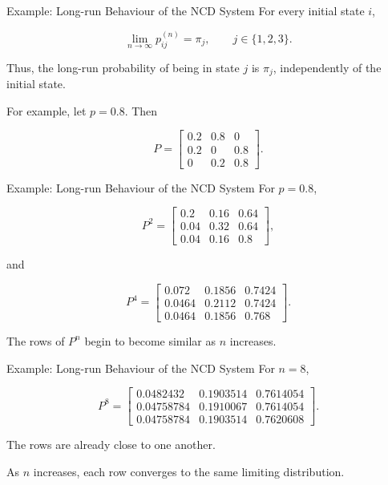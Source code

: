 \documentclass[
  ignorenonframetext,
  aspectratio=169,
]{beamer}
\begin{document}
\begin{frame}{Example: Long-run Behaviour of the NCD System}
\protect{}\label{example-long-run-behaviour-of-the-ncd-system-1}
For every initial state \(i\),

\[
\lim_{n\to\infty}p_{ij}^{(n)}
=
\pi_j,
\qquad j\in\{1,2,3\}.
\]

Thus, the long-run probability of being in state \(j\) is \(\pi_j\),
independently of the initial state.

For example, let \(p=0.8\). Then

\[
P=
\begin{bmatrix}
0.2&0.8&0\\
0.2&0&0.8\\
0&0.2&0.8
\end{bmatrix}.
\]
\end{frame}

\begin{frame}{Example: Long-run Behaviour of the NCD System}
\protect{}\label{example-long-run-behaviour-of-the-ncd-system-2}
For \(p=0.8\),

\[
P^2=
\begin{bmatrix}
0.2&0.16&0.64\\
0.04&0.32&0.64\\
0.04&0.16&0.8
\end{bmatrix},
\]

and

\[
P^4=
\begin{bmatrix}
0.072&0.1856&0.7424\\
0.0464&0.2112&0.7424\\
0.0464&0.1856&0.768
\end{bmatrix}.
\]

The rows of \(P^n\) begin to become similar as \(n\) increases.
\end{frame}

\begin{frame}{Example: Long-run Behaviour of the NCD System}
\protect{}\label{example-long-run-behaviour-of-the-ncd-system-3}
For \(n=8\),

\[
P^8=
\begin{bmatrix}
0.0482432&0.1903514&0.7614054\\
0.04758784&0.1910067&0.7614054\\
0.04758784&0.1903514&0.7620608
\end{bmatrix}.
\]

The rows are already close to one another.

As \(n\) increases, each row converges to the same limiting
distribution.
\end{frame}
\end{document}
